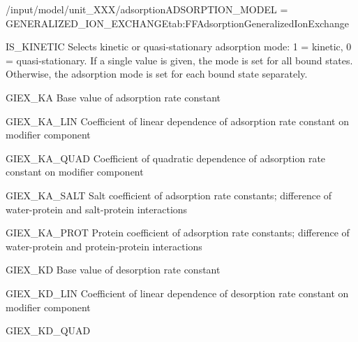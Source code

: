 \begin{condsubgroup}{/input/model/unit\_XXX/adsorption}{ADSORPTION\_MODEL = GENERALIZED\_ION\_EXCHANGE}{tab:FFAdsorptionGeneralizedIonExchange}
  \begin{dataset}[type=int,range={$\{ 0,1 \}$},length={1 / \texttt{NTOTALBND}}]{IS\_KINETIC}
    Selects kinetic or quasi-stationary adsorption mode: 1 = kinetic, 0 = quasi-stationary.
    If a single value is given, the mode is set for all bound states.
    Otherwise, the adsorption mode is set for each bound state separately.
  \end{dataset}
  \begin{dataset}[unit=\si{\raiseto{3}\metre\of{MP}\per\raiseto{3}\metre\of{SP}\per\second}, type=double,range={$\geq 0$},length={\texttt{NCOMP}}]{GIEX\_KA}
    Base value of adsorption rate constant
  \end{dataset}
  \begin{dataset}[unit=\si{\per\ModUnit},type=double,length={\texttt{NCOMP}}]{GIEX\_KA\_LIN}
    Coefficient of linear dependence of adsorption rate constant on modifier component
  \end{dataset}
  \begin{dataset}[unit=\si{\per\square\ModUnit},type=double,length={\texttt{NCOMP}}]{GIEX\_KA\_QUAD}
    Coefficient of quadratic dependence of adsorption rate constant on modifier component
  \end{dataset}
  \begin{dataset}[type=double,length={\texttt{NCOMP}}]{GIEX\_KA\_SALT}
    Salt coefficient of adsorption rate constants; difference of water-protein and salt-protein interactions
  \end{dataset}
  \begin{dataset}[unit=\si{\raiseto{3}\metre\of{MP}\per\mol}, type=double,length={\texttt{NCOMP}}]{GIEX\_KA\_PROT}
    Protein coefficient of adsorption rate constants; difference of water-protein and protein-protein interactions
  \end{dataset}
  \begin{dataset}[unit=\si{\per\second}, type=double,range={$\geq 0$},length={\texttt{NCOMP}}]{GIEX\_KD}
    Base value of desorption rate constant
  \end{dataset}
  \begin{dataset}[unit=\si{\per\ModUnit},type=double,length={\texttt{NCOMP}}]{GIEX\_KD\_LIN}
    Coefficient of linear dependence of desorption rate constant on modifier component
  \end{dataset}
  \begin{dataset}[unit=\si{\per\square\ModUnit},type=double,length={\texttt{NCOMP}}]{GIEX\_KD\_QUAD}

\end{dataset}
\end{condsubgroup}
